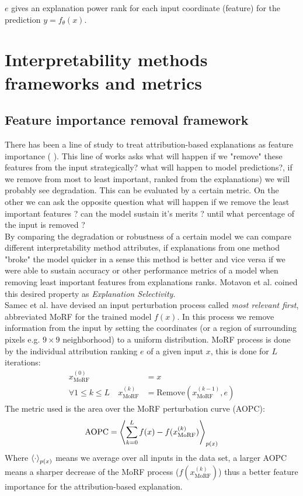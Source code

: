\documentclass[12pt]{report}
\begin{document}
$e$ gives an explanation power rank for each input coordinate (feature) for the prediction $y=f_{\theta}(x)$.


\section{Interpretability methods frameworks and metrics}

\subsection{Feature importance removal framework}

There has been a line of study to treat attribution-based explanations as feature importance (\cite{https://doi.org/10.48550/arxiv.1509.06321} \cite{https://doi.org/10.48550/arxiv.1806.10758} \cite{DBLP:journals/corr/MontavonSM17}).  This line of works asks what will happen if we "remove" these features from the input strategically?  what will happen to model predictions?, if we remove from most to least important, ranked from the explanations) we will probably see degradation. This can be evaluated by a certain metric. On the other we can ask the opposite question what will happen if we remove the least important features ? can the model sustain it's merits ? until what percentage of the input is removed ? \\

By comparing the degradation or robustness of a certain model we can compare different interpretability method attributes, if explanations from one method "broke" the model quicker in a sense this method is better and vice versa if we were able to sustain accuracy or other performance metrics of a model when removing least important features from explanations ranks. Motavon et al. \cite{DBLP:journals/corr/MontavonSM17} coined this desired property as \textit{Explanation Selectivity}.\\

Samec et al. \cite{https://doi.org/10.48550/arxiv.1509.06321} have devised an input perturbation process called \textit{most relevant first}, abbreviated MoRF for the trained model $f(x)$. In this process we remove information from the input by setting the coordinates (or a region of surrounding pixels e.g. $9 \times 9$ neighborhood) to a uniform distribution. MoRF process is done by the individual attribution ranking $e$ of a given input $x$, this is done for $L$ iterations:
\begin{align*}
	x_{\text{MoRF}}^{(0)} & = x  \\ 
	\forall 1 \le k \le L \quad x_{\text{MoRF}}^{(k)} &= \text{Remove} (x_{\text{MoRF}}^{(k-1)}, e)	
\end{align*}
The metric used is the area over the MoRF perturbation curve (AOPC):
\begin{align*}
	\text{AOPC} = \Braket{	\sum_{k=0}^{L}f(x) -f(x_{\text{MoRF}}^{(k)})}_{p(x)}
\end{align*}
Where $\Braket{\cdot}_{p(x)}$ means we average over all inputs in the data set, a larger AOPC means a sharper decrease of the MoRF process ($f(x_{\text{MoRF}}^{(k)})$) thus a better feature importance for the attribution-based explanation. \\
\end{document}
